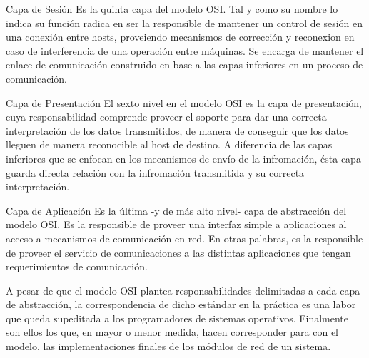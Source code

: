 Capa de Sesión
Es la quinta capa del modelo OSI. Tal y como su nombre lo indica su función radica en ser la responsible de mantener un control de sesión en una conexión entre hosts, proveiendo mecanismos de corrección y reconexion en caso de interferencia de una operación entre máquinas. Se encarga de mantener el enlace de comunicación construido en base a las capas inferiores en un proceso de comunicación.

Capa de Presentación
El sexto nivel en el modelo OSI es la capa de presentación, cuya responsabilidad comprende proveer el soporte para dar una correcta interpretación de los datos transmitidos, de manera de conseguir que los datos lleguen de manera reconocible al host de destino. A diferencia de las capas inferiores que se enfocan en los mecanismos de envío de la infromación, ésta capa guarda directa relación con la infromación transmitida y su correcta interpretación.


Capa de Aplicación
Es la última -y de más alto nivel- capa de abstracción del modelo OSI. Es la responsible de proveer una interfaz simple a aplicaciones al acceso a mecanismos de comunicación en red. En otras palabras, es la responsible de proveer el servicio de comunicaciones a las distintas aplicaciones que tengan requerimientos de comunicación.


A pesar de que el modelo OSI plantea responsabilidades delimitadas a cada capa de abstracción, la correspondencia de dicho estándar en la práctica es una labor que queda supeditada a los programadores de sistemas operativos. Finalmente son ellos los que, en mayor o menor medida, hacen corresponder para con el modelo, las implementaciones finales de los módulos de red de un sistema.
